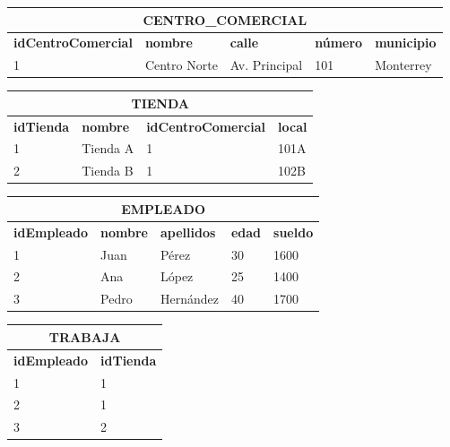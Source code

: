 \documentclass[
    12pt,
    a4paper,
    addpoints,
    answers,
    convocatoria=ord,
    titulacion=NoCD,
    curso=2024/2025,
]{db-exam}
\begin{document}
\begin{questions}
\begin{table}[h!]
\begin{tabular}{|p{4cm}|p{2.5cm}|p{2.5cm}|p{2cm}|p{2.5cm}|}
\multicolumn{5}{c}{\textbf{CENTRO\_COMERCIAL}} \\ \hline
\textbf{idCentroComercial} & \textbf{nombre}      & \textbf{calle}         & \textbf{número} & \textbf{municipio} \\ \hline
1                          & Centro Norte         & Av. Principal          & 101             & Monterrey          \\ \hline
\end{tabular}
\end{table}

\begin{table}[h!]
\centering
\small
\begin{tabular}{|p{2cm}|p{2cm}|p{4cm}|p{1cm}|}
\multicolumn{4}{c}{\textbf{TIENDA}} \\ \hline
\textbf{idTienda} & \textbf{nombre} & \textbf{idCentroComercial} & \textbf{local} \\ \hline
1                 & Tienda A        & 1                            & 101A           \\ \hline
2                 & Tienda B        & 1                            & 102B           \\ \hline
\end{tabular}
\end{table}

\begin{table}[h!]
\centering
\small
\begin{tabular}{|p{2.5cm}|p{2.5cm}|p{2.5cm}|p{1.5cm}|p{3cm}|}
\multicolumn{5}{c}{\textbf{EMPLEADO}} \\ \hline
\textbf{idEmpleado} & \textbf{nombre} & \textbf{apellidos} & \textbf{edad} & \textbf{sueldo} \\ \hline
1                   & Juan            & Pérez              & 30            & 1600            \\ \hline
2                   & Ana             & López              & 25            & 1400            \\ \hline
3                   & Pedro           & Hernández          & 40            & 1700            \\ \hline
\end{tabular}
\end{table}

\begin{table}[h!]
\centering
\small
\begin{tabular}{|p{2.5cm}|p{2.5cm}|}
\multicolumn{2}{c}{\textbf{TRABAJA}} \\ \hline
\textbf{idEmpleado} & \textbf{idTienda} \\ \hline
1                     & 1                   \\ \hline
2                     & 1                   \\ \hline
3                     & 2                   \\ \hline
\end{tabular}
\end{table}


\end{questions}
\end{document}

